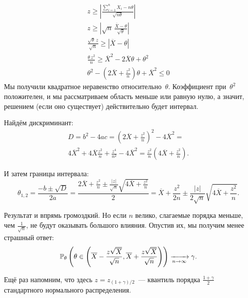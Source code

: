\begin{exmp}
    \begin{gather*}
        z \geqslant \left| \frac{\sum\limits_{i=1}^{n} X_i - n\theta}{\sqrt{n\theta}} \right| \\
        z \geqslant \left| \sqrt{n} \, \frac{\overline{X} - \theta}{\sqrt{\theta}} \right| \\
        \frac{\sqrt{\theta}\, z}{\sqrt{n}} \geqslant |\overline{X} - \theta| \\
        \frac{\theta \, z^2}{n} \geqslant \overline{X}^2 - 2\overline{X}\theta + \theta^2 \\
        \theta^2 - \left(2\overline{X} + \frac{z^2}{n}\right)\theta + \overline{X}^2 \leqslant 0
    \end{gather*}
    Мы получили квадратное неравенство относительно~$\theta$.
    Коэффициент при~$\theta^2$ положителен, и мы рассматриваем область меньше или равную нулю, 
    а значит, решением (если оно существует) действительно будет интервал.

    Найдём дискриминант:
    \begin{gather*}
        D = b^2 - 4ac = \left(2\overline{X} + \frac{z^2}{n}\right)^2 - 4 \overline{X}^2 = \\
        4 \overline{X}^2 + 4\overline{X}\frac{z^2}{n} + \frac{z^4}{n^2} - 4 \overline{X}^2 = 
        \frac{z^2}{n} \left(4 \overline{X} + \frac{z^2}{n}\right).
    \end{gather*}

    И затем границы интервала:
    \begin{equation*}
        \theta_{1, 2} = \frac{-b \pm \sqrt{D}}{2a} = 
        \frac{2 \overline{X} + \frac{z^2}{n} \pm \frac{|z|}{\sqrt{n}} \sqrt{4\overline{X} + \frac{z^2}{n}} }{2} = 
        \overline{X} + \frac{z^2}{2n} \pm \frac{|z|}{2\sqrt{n}} \sqrt{4\overline{X} + \frac{z^2}{n}}.
    \end{equation*}
    
    Результат и впрямь громоздкий.
    Но если $n$ велико, слагаемые порядка меньше, чем $\frac{1}{\sqrt{n}}$, не будут оказывать большого влияния.
    Опустив их, мы получим менее страшный ответ:
    \begin{equation*}
        \mathbb{P}_{\theta} \left(
        \theta \in \left( \overline{X} - \frac{z \sqrt{\overline{X}}}{\sqrt{n}}, 
                          \overline{X} + \frac{z \sqrt{\overline{X}}}{\sqrt{n}} \right)
        \right) \xrightarrow[n \to \infty]{} \gamma.
    \end{equation*}

    Ещё раз напомним, что здесь $z = z_{(1 + \gamma)/2}$~--- квантиль порядка $\frac{1 + \gamma}{2}$ стандартного нормального распределения.
\end{exmp}

